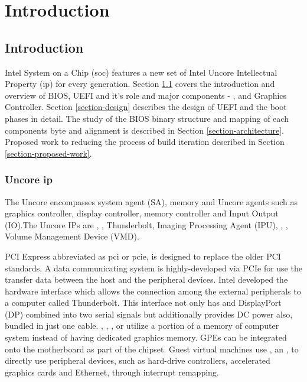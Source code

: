 \chapter{Introduction}\label{chapter-introduction}
\section{Introduction}\label{section-introduction}
Intel System on a Chip (\gls{soc}) \cite{intel-soc} features a new set of Intel Uncore Intellectual Property (\gls{ip}) for every generation.
Section \ref{section-introduction} covers the introduction and overview of BIOS, UEFI and it's role and major components - ,  and Graphics Controller. Section \ref{section-design} describes the design of UEFI and the boot phases in detail. The study of the BIOS binary structure and mapping of each components byte and alignment is described in Section \ref{section-architecture}. Proposed work to reducing the process of build iteration described in Section \ref{section-proposed-work}. 

\subsection{Uncore \gls{ip}}
The Uncore encompasses system agent (SA), memory and Uncore agents such as graphics controller, display controller, memory controller and Input Output (IO).The Uncore IPs are , , Thunderbolt, Imaging Processing Agent (IPU), , , Volume Management Device (VMD).

PCI Express abbreviated as \gls{pci} or \gls{pcie}, is designed to replace the older PCI standards. A data communicating system is highly-developed via PCIe for use the transfer data between the host and the peripheral devices. Intel developed the hardware interface which allows the connection among the external peripherals to a computer called Thunderbolt. This interface not only has  and DisplayPort (DP) combined into two serial signals but additionally provides DC power also, bundled in just one cable.
, , ,  or  utilize a portion of a memory of computer system instead of having dedicated graphics memory.
GPEs can be integrated onto the motherboard as part of the chipset. Guest virtual machines use , an , to directly use peripheral devices, such as hard-drive controllers, accelerated graphics cards and Ethernet, through interrupt remapping.

